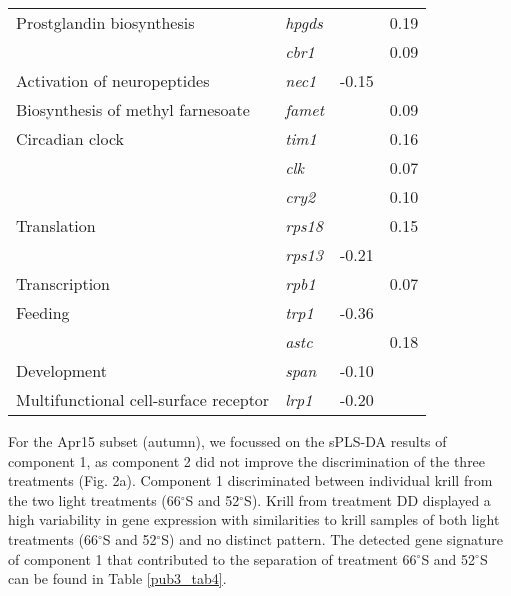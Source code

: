 \begin{table}[]
\begin{tabular}{@{}llll@{}}
Prostglandin biosynthesis             & \textit{hpgds}  & \cellcolor[HTML]{EFEFEF}      & 0.19     \\
                                      & \textit{cbr1}   & \cellcolor[HTML]{EFEFEF}      & 0.09     \\
Activation of neuropeptides           & \textit{nec1}   & \cellcolor[HTML]{EFEFEF}-0.15 &          \\
Biosynthesis of methyl farnesoate     & \textit{famet}  & \cellcolor[HTML]{EFEFEF}      & 0.09     \\
Circadian clock                       & \textit{tim1}   & \cellcolor[HTML]{EFEFEF}      & 0.16     \\
                                      & \textit{clk}    & \cellcolor[HTML]{EFEFEF}      & 0.07     \\
                                      & \textit{cry2}   & \cellcolor[HTML]{EFEFEF}      & 0.10     \\
Translation                           & \textit{rps18}  & \cellcolor[HTML]{EFEFEF}      & 0.15     \\
                                      & \textit{rps13}  & \cellcolor[HTML]{EFEFEF}-0.21 &          \\
Transcription                         & \textit{rpb1}   & \cellcolor[HTML]{EFEFEF}      & 0.07     \\
Feeding                               & \textit{trp1}   & \cellcolor[HTML]{EFEFEF}-0.36 &          \\
                                      & \textit{astc}   & \cellcolor[HTML]{EFEFEF}      & 0.18     \\
Development                           & \textit{span}   & \cellcolor[HTML]{EFEFEF}-0.10 &          \\
Multifunctional cell-surface receptor & \textit{lrp1}   & \cellcolor[HTML]{EFEFEF}-0.20 &          \\ \bottomrule
\end{tabular}
\end{table}



For the Apr15 subset (autumn), we focussed on the sPLS-DA results of component
1, as component 2 did not improve the discrimination of the three treatments
(Fig. 2a). Component 1 discriminated between individual krill from the two
light treatments (66$^{\circ}$S and 52$^{\circ}$S). Krill from treatment DD
displayed a high variability in gene expression with similarities to krill
samples of both light treatments (66$^{\circ}$S and 52$^{\circ}$S) and no
distinct pattern. The detected gene signature of component 1 that contributed
to the separation of treatment 66$^{\circ}$S and 52$^{\circ}$S can be found in
Table \ref{pub3_tab4}.

